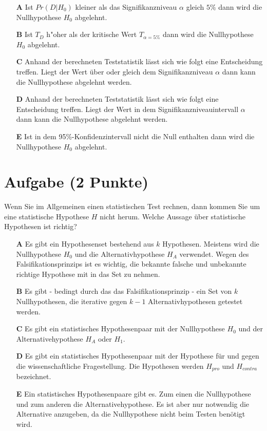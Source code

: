 \documentclass[a4paper, 9pt]{scrartcl}\usepackage[]{graphicx}\usepackage[]{xcolor}
\begin{document}
\begin{enumerate}
\item [\textbf{A} \msquare] Ist $Pr(D|H_0)$ kleiner als das Signifikanzniveau $\alpha$ gleich $5\%$ dann wird die Nullhypothese $H_0$ abgelehnt.
\item [\textbf{B} \msquare] Ist $T_{D}$ h{"o}her als der kritische Wert $T_{\alpha = 5\%}$ dann wird die Nullhypothese $H_0$ abgelehnt.
\item [\textbf{C} \msquare] Anhand der berechneten Teststatistik lässt sich wie folgt eine Entscheidung treffen. Liegt der Wert über oder gleich dem Signifikanzniveau $\alpha$ dann kann die Nullhypothese abgelehnt werden.
\item [\textbf{D} \msquare] Anhand der berechneten Teststatistik lässt sich wie folgt eine Entscheidung treffen. Liegt der Wert in dem Signifikanzniveauintervall $\alpha$ dann kann die Nullhypothese abgelehnt werden.
\item [\textbf{E} \msquare] Ist in dem 95\%-Konfidenzintervall nicht die Null enthalten dann wird die Nullhypothese $H_0$ abgelehnt.
\end{enumerate}

\section{Aufgabe \hfill (2 Punkte)}



Wenn Sie im Allgemeinen einen statistischen Test rechnen, dann kommen Sie um eine statistische Hypothese $H$ nicht herum. Welche Aussage über statistische Hypothesen ist richtig?



\begin{enumerate}
\item [\textbf{A} \msquare] Es gibt ein Hypothesenset bestehend aus $k$ Hypothesen. Meistens wird die Nullhypothese $H_0$ und die Alternativhypothese $H_A$ verwendet. Wegen des Falsifikationsprinzips ist es wichtig, die bekannte falsche und unbekannte richtige Hypothese mit in das Set zu nehmen.
\item [\textbf{B} \msquare] Es gibt - bedingt durch das das Falsifikationsprinzip - ein Set von $k$ Nullhypothesen, die iterative gegen $k-1$ Alternativhypothesen getestet werden.
\item [\textbf{C} \msquare] Es gibt ein statistisches Hypothesenpaar mit der Nullhypothese $H_0$ und der Alternativehypothese $H_A$ oder $H_1$.
\item [\textbf{D} \msquare] Es gibt ein statistisches Hypothesenpaar mit der Hypothese für und gegen die wissenschaftliche Fragestellung. Die Hypothesen werden $H_{pro}$ und $H_{contra}$ bezeichnet.
\item [\textbf{E} \msquare] Ein statistisches Hypothesenpaare gibt es. Zum einen die Nullhypothese und zum anderen die Alternativehypothese. Es ist aber nur notwendig die Alternative anzugeben, da die Nullhypothese nicht beim Testen benötigt wird.
\end{enumerate}
\end{document}
